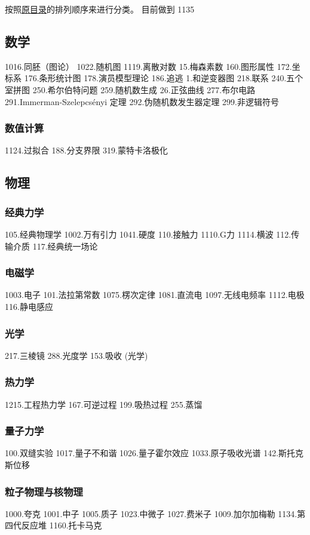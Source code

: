 
\begin{issues}
\issueDraft
\end{issues}

按照\href{https://wuli.wiki/assets/sogou}{原目录}的排列顺序来进行分类。 目前做到 1135

\subsection{数学}
1016.同胚（图论）
1022.随机图
1119.离散对数
15.梅森素数
160.图形属性
172.坐标系
176.条形统计图
178.演员模型理论
186.追逃
1.和逆变器图
218.联系
240.五个室拼图
250.希尔伯特问题
259.随机数生成
26.正弦曲线
277.布尔电路
291.Immerman-Szelepcsényi 定理
292.伪随机数发生器定理
299.非逻辑符号
\subsubsection{数值计算}
1124.过拟合
188.分支界限
319.蒙特卡洛极化

\subsection{物理}
\subsubsection{经典力学}
105.经典物理学
1002.万有引力
1041.硬度
110.接触力
1110.G力
1114.横波
112.传输介质
117.经典统一场论
\subsubsection{电磁学}
1003.电子
101.法拉第常数
1075.楞次定律
1081.直流电
1097.无线电频率
1112.电极
116.静电感应
\subsubsection{光学}
217.三棱镜
288.光度学
153.吸收 (光学)
\subsubsection{热力学}
1215.工程热力学
167.可逆过程
199.吸热过程
255.蒸馏
\subsubsection{量子力学}
100.双缝实验
1017.量子不和谐
1026.量子霍尔效应
1033.原子吸收光谱
142.斯托克斯位移
\subsubsection{粒子物理与核物理}
1000.夸克
1001.中子
1005.质子
1023.中微子
1027.费米子
1009.加尔加梅勒
1134.第四代反应堆
1160.托卡马克
